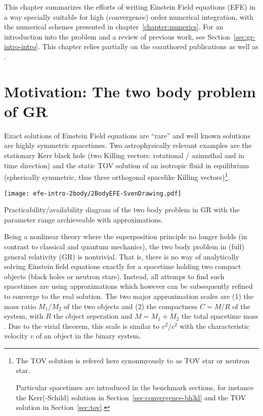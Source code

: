 This chapter summarizes the efforts of writing Einstein Field equations
(EFE) \cite{Einstein15a,Einstein15b} in a way specially suitable for
high (convergence) order numerical integration, with the numerical
schemes presented in chapter~\ref{chapter:numerics}. For an introduction
into the problem and a review of previous work, see
Section~\vref{sec:gr-intro-intro}.
This chapter relies partially on the coauthored publications
 \cite{Dumbser2017} as well as \cite{Koeppel2017}.

\section{Motivation: The two body problem of GR}\label{sec:gr-intro}
Exact solutions of Einstein Field equations are ``rare'' \cite{Kramer80}
and well known solutions are highly symmetric spacetimes. Two astrophysically
relevant examples are the stationary Kerr black hole (two Killing vectors:
rotational / azimuthal and in time direction) and the static TOV solution of an
isotropic fluid in equilibrium (spherically symmetric, thus three orthogonal
spacelike Killing vectors)\footnote{
    The TOV solution is refered here synonmyously to as TOV star or neutron star.
    
	Particular spacetimes are introduced in the benchmark 
	sections,
	for instance the Kerr(-Schild) solution in 
	Section~\vref{sec:convergence-bh3d} and the TOV solution 
	in Section~\vref{sec:tov}. 
}.

\begin{marginfigure}
\texttt{[image: efe-intro-2body/2BodyEFE-SvenDrawing.pdf]}
\caption[
  EFE 2body parameter space, drawn with Inkscape. \exclusive
]{
 Practicability/availability diagram of the two body problem in GR with
 the parameter range archieveable with approximations.
}
\label{fig:efe-intro-2body-paramspace}
\end{marginfigure}
%
Being a nonlinear theory where the superposition principle no longer holds (in contrast
to classical and quantum mechanics), the two body problem 
in (full) general relativity (GR) is nontrivial. That is, there is no way of analytically solving Einstein field
equations exactly for a spacetime holding two compact objects (black holes or neutron stars).
Instead, all attemps to find such spacetimes are using approximations which however
can be subsequently refined to converge to the real solution. The two major approximation
scales are
(1) the mass ratio $M_1/M_2$ of the two objects and
(2) the compactness $C=M/R$ of the system, with $R$ the object
seperation and $M=M_1+M_2$ the total spacetime mass
\cite{MTW1973,Wald84,Buonanno2014}. Due to the virial theorem, this
scale is similar to $v^2/c^2$ with the characteristic velocity $v$ of an object in the
binary system.

